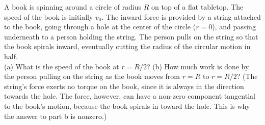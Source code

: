 A book is spinning around a circle of radius $R$ on top of a flat
tabletop. The speed of the book is initially $v_0$. The inward
force is provided by a string attached to the book, going through a
hole at the center of the circle ($r=0$), and passing
underneath to a person holding the string. The person pulls on
the string so that the book spirals inward,
eventually cutting the radius of the circular motion in half.\\
%
(a) What is the speed of the book at $r = R/2$?\answercheck\hwendpart
%
(b) How much work is done by the person pulling on the string as
the book moves from $r=R$ to $r=R/2$?\answercheck\hwendpart
%
\noindent (The string's force exerts no torque on the book, since it is
always in the direction towards the hole. The force, however,
can have a non-zero component tangential to the book's motion, because the book
spirals in toward the hole. This is why the answer to part b is
nonzero.)

